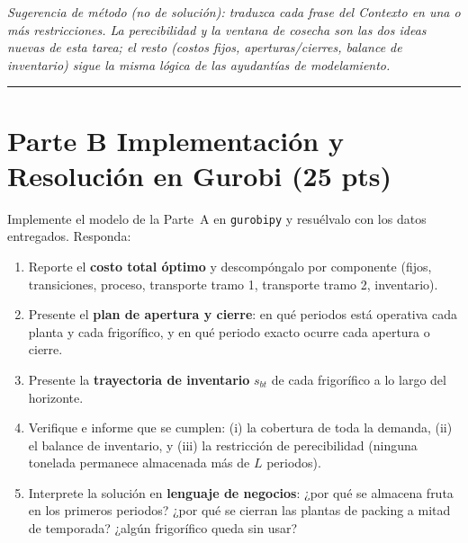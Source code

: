 \documentclass[12pt,a4paper]{article}
\begin{document}
\noindent\textit{Sugerencia de método (no de solución): traduzca cada frase del
Contexto en una o más restricciones. La perecibilidad y la ventana de cosecha son
las dos ideas nuevas de esta tarea; el resto (costos fijos, aperturas/cierres,
balance de inventario) sigue la misma lógica de las ayudantías de modelamiento.}

\noindent\rule{\linewidth}{0.4pt}

\section*{Parte B \quad Implementación y Resolución en Gurobi \hfill\normalfont\normalsize(25 pts)}

Implemente el modelo de la Parte~A en \texttt{gurobipy} y resuélvalo con los datos
entregados. Responda:

\begin{enumerate}[label=\alph*), leftmargin=*, topsep=2pt]
    \item Reporte el \textbf{costo total óptimo} y descompóngalo por componente
          (fijos, transiciones, proceso, transporte tramo 1, transporte tramo 2,
          inventario).
    \item Presente el \textbf{plan de apertura y cierre}: en qué periodos está
          operativa cada planta y cada frigorífico, y en qué periodo exacto ocurre
          cada apertura o cierre.
    \item Presente la \textbf{trayectoria de inventario} $s_{bt}$ de cada
          frigorífico a lo largo del horizonte.
    \item Verifique e informe que se cumplen: (i) la cobertura de toda la demanda,
          (ii) el balance de inventario, y (iii) la restricción de perecibilidad
          (ninguna tonelada permanece almacenada más de $L$ periodos).
    \item Interprete la solución en \textbf{lenguaje de negocios}: ¿por qué se
          almacena fruta en los primeros periodos? ¿por qué se cierran las plantas
          de packing a mitad de temporada? ¿algún frigorífico queda sin usar?
\end{enumerate}
\end{document}
